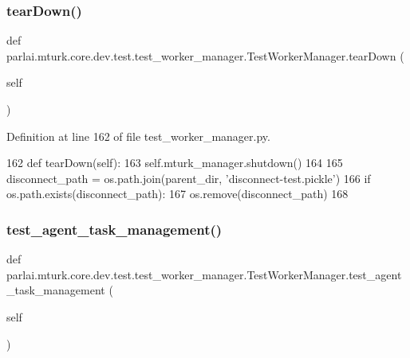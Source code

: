 \subsubsection{\texorpdfstring{tear\+Down()}{tearDown()}}
{\footnotesize\ttfamily def parlai.\+mturk.\+core.\+dev.\+test.\+test\+\_\+worker\+\_\+manager.\+Test\+Worker\+Manager.\+tear\+Down (\begin{DoxyParamCaption}\item[{}]{self }\end{DoxyParamCaption})}



Definition at line 162 of file test\+\_\+worker\+\_\+manager.\+py.


\begin{DoxyCode}
162     \textcolor{keyword}{def }tearDown(self):
163         self.mturk\_manager.shutdown()
164 
165         disconnect\_path = os.path.join(parent\_dir, \textcolor{stringliteral}{'disconnect-test.pickle'})
166         \textcolor{keywordflow}{if} os.path.exists(disconnect\_path):
167             os.remove(disconnect\_path)
168 
\end{DoxyCode}
\mbox{\label{classparlai_1_1mturk_1_1core_1_1dev_1_1test_1_1test__worker__manager_1_1TestWorkerManager_aa375b82e666943c204207cc33cad34a1}} 
\subsubsection{\texorpdfstring{test\+\_\+agent\+\_\+task\+\_\+management()}{test\_agent\_task\_management()}}
{\footnotesize\ttfamily def parlai.\+mturk.\+core.\+dev.\+test.\+test\+\_\+worker\+\_\+manager.\+Test\+Worker\+Manager.\+test\+\_\+agent\+\_\+task\+\_\+management (\begin{DoxyParamCaption}\item[{}]{self }\end{DoxyParamCaption})}

